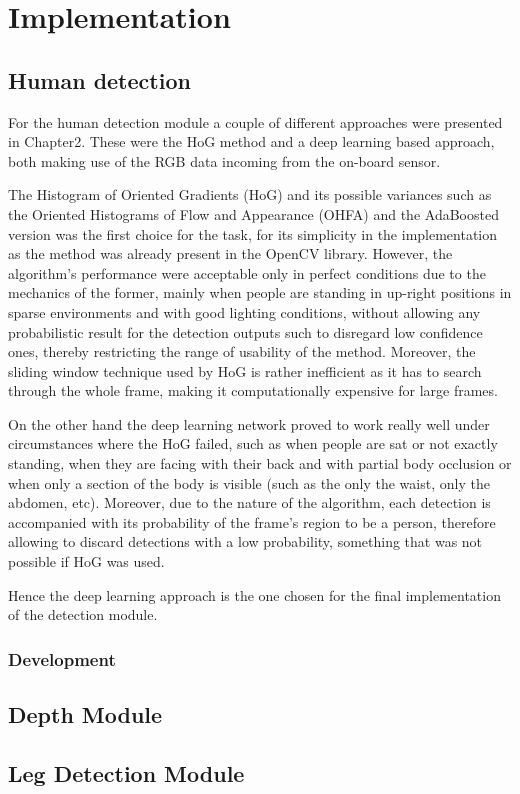 \chapter{Implementation}
\label{chapter3}

\section{Human detection}

For the human detection module a couple of different approaches were presented in Chapter2. These were the HoG method and a deep learning based approach, both making use of the RGB data incoming from the on-board sensor.

The Histogram of Oriented Gradients (HoG) and its possible variances such as the Oriented Histograms of Flow and Appearance (OHFA) and the AdaBoosted version was the first choice for the task, for its simplicity in the implementation as the method was already present in the OpenCV library. However, the algorithm's performance were acceptable only in perfect conditions due to the mechanics of the former, mainly when people are standing in up-right positions in sparse environments and with good lighting conditions, without allowing any probabilistic result for the detection outputs such to disregard low confidence ones, thereby restricting the range of usability of the method. Moreover, the sliding window technique used by HoG is rather inefficient as it has to search through the whole frame, making it computationally expensive for large frames.

On the other hand the deep learning network proved to work really well under circumstances where the HoG failed, such as when people are sat or not exactly standing, when they are facing with their back and with partial body occlusion or when only a section of the body is visible (such as the only the waist, only the abdomen, etc). Moreover, due to the nature of the algorithm, each detection is accompanied with its probability of the frame's region to be a person, therefore allowing to discard detections with a low probability, something that was not possible if HoG was used.

Hence the deep learning approach is the one chosen for the final implementation of the detection module.

\subsection{Development}


\section{Depth Module}
\section{Leg Detection Module}